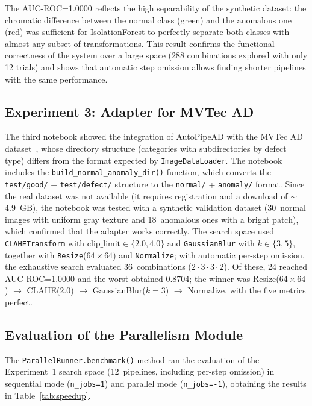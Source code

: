 \documentclass[conference]{IEEEtran}
\begin{document}
The AUC-ROC=1.0000 reflects the high separability of the synthetic dataset: the
chromatic difference between the normal class (green) and the anomalous one
(red) was sufficient for IsolationForest to perfectly separate both classes
with almost any subset of transformations. This result confirms the functional
correctness of the system over a large space (288 combinations explored with
only 12 trials) and shows that automatic step omission allows finding shorter
pipelines with the same performance.

\subsection{Experiment 3: Adapter for MVTec AD}

The third notebook showed the integration of AutoPipeAD with the MVTec AD
dataset~\cite{bergmann2019mvtec}, whose directory structure (categories with
subdirectories by defect type) differs from the format expected by
\texttt{ImageDataLoader}. The notebook includes the
\texttt{build\_normal\_anomaly\_dir()} function, which converts the
\texttt{test/good/} + \texttt{test/defect/} structure to the \texttt{normal/}
+ \texttt{anomaly/} format. Since the real dataset was not available (it
requires registration and a download of $\sim$4.9~GB), the notebook was tested
with a synthetic validation dataset (30~normal images with uniform gray texture
and 18~anomalous ones with a bright patch), which confirmed that the adapter
works correctly. The search space used \texttt{CLAHETransform} with
$\text{clip\_limit} \in \{2.0, 4.0\}$ and \texttt{GaussianBlur} with
$k \in \{3, 5\}$, together with \texttt{Resize}($64\times64$) and
\texttt{Normalize}; with automatic per-step omission, the exhaustive search
evaluated 36~combinations ($2\cdot3\cdot3\cdot2$). Of these, 24 reached
AUC-ROC=1.0000 and the worst obtained 0.8704; the winner was
Resize($64\times64$) $\to$ CLAHE($2.0$) $\to$ GaussianBlur($k=3$) $\to$
Normalize, with the five metrics perfect.

\subsection{Evaluation of the Parallelism Module}

The \texttt{ParallelRunner.benchmark()} method ran the evaluation of the
Experiment~1 search space (12~pipelines, including per-step omission) in
sequential mode (\texttt{n\_jobs=1}) and parallel mode (\texttt{n\_jobs=-1}),
obtaining the results in Table~\ref{tab:speedup}.
\end{document}
